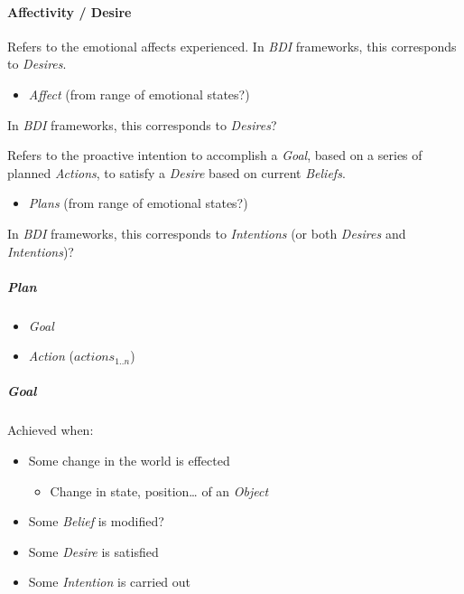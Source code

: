 \documentclass[]{article}
\begin{document}
\paragraph{Affectivity / Desire}\label{affectivity}

Refers to the emotional affects experienced. In \emph{BDI} frameworks,
this corresponds to \emph{Desires}.

\begin{itemize}
\itemsep1pt\parskip0pt
\item
  \emph{Affect} (from range of emotional states?)
\end{itemize}

In \emph{BDI} frameworks, this corresponds to \emph{Desires}?


Refers to the proactive intention to accomplish a \emph{Goal}, based on
a series of planned \emph{Actions}, to satisfy a \emph{Desire} based on
current \emph{Beliefs}.

\begin{itemize}
\itemsep1pt\parskip0pt
\item
  \emph{Plans} (from range of emotional states?)
\end{itemize}

In \emph{BDI} frameworks, this corresponds to \emph{Intentions} (or both
\emph{Desires} and \emph{Intentions})?

\subparagraph{Plan}\label{plan}

\begin{itemize}
\itemsep1pt\parskip0pt
\item
  \emph{Goal}
\item
  \emph{Action} (\(actions_{1..n}\))
\end{itemize}

\subparagraph{Goal}\label{goal}

Achieved when:

\begin{itemize}
\itemsep1pt\parskip0pt
\item
  Some change in the world is effected

  \begin{itemize}
  \itemsep1pt\parskip0pt
  \item
    Change in state, position\ldots{} of an \emph{Object}
  \end{itemize}
\item
  Some \emph{Belief} is modified?
\item
  Some \emph{Desire} is satisfied
\item
  Some \emph{Intention} is carried out
\end{itemize}
\end{document}
